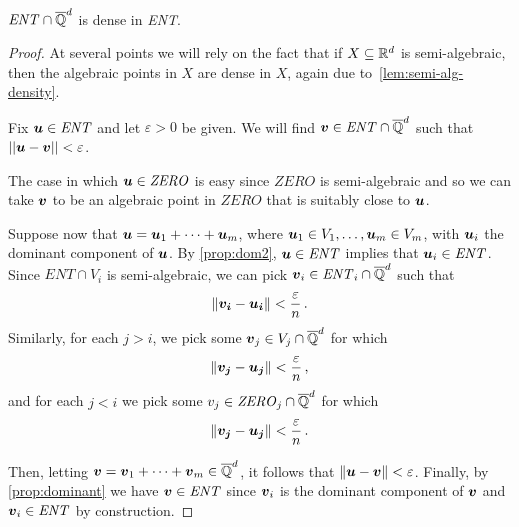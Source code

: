 \begin{corollary}
$\mathit{ENT}\cap\overline{\mathbb{Q}}^{d}$ is dense in \textit{ENT}.
\label{corl:dense}
\end{corollary}

\begin{proof}
  At several points we will rely on the fact that if $X\subseteq\mathbb{R}^{d}$ is semi-algebraic, then the algebraic points in $X$ are dense in $X$, again due to~\cref{lem:semi-alg-density}.

  Fix $\boldsymbol u\in\mathit{ENT}$ and let $\varepsilon>0$ be
  given. We will find $\boldsymbol v\in \mathit{ENT}\cap \overline{\mathbb{Q}}^{d}$
  such that $||\boldsymbol u-\boldsymbol v||<\varepsilon$.

  The case in which $\boldsymbol u \in \mathit{ZERO}$ is easy since
  $\mathit{ZERO}$ is semi-algebraic and so we can take $\boldsymbol v$
  to be an algebraic point in $\mathit{ZERO}$ that is suitably close
  to $\boldsymbol u$.

  Suppose now that $\boldsymbol u=\boldsymbol u_1+\cdots+\boldsymbol
  u_m$, where $\boldsymbol u_1\in V_1,\ldots,\boldsymbol u_m\in V_m$,
  with $\boldsymbol u_i$ the dominant component of $\boldsymbol u$. By
  \cref{prop:dom2}, $\boldsymbol u\in\mathit{ENT}$ implies
  that $\boldsymbol u_i\in \mathit{ENT}$.
  Since $\mathit{ENT}\cap V_i$
  is semi-algebraic, we can pick $\boldsymbol v_i\in \mathit{ENT}_{i}\cap\overline{\mathbb{Q}}^{d}$ such that
  \begin{equation*}
    \| \boldsymbol{v_{i}} -\boldsymbol{u_{i}} \| < \frac{\varepsilon}{n} \, .
  \end{equation*}
  Similarly, for each $j>i$, we pick some $\boldsymbol v_j\in
  V_j\cap \overline{\mathbb{Q}}^{d}$ for which
  \begin{equation*}
    \| \boldsymbol{v_{j}} - \boldsymbol{u_{j}} \| < \frac{\varepsilon}{n} \, ,
  \end{equation*}
  and for each $j<i$ we pick some $v_j \in \mathit{ZERO}_{j} \cap \overline{\mathbb{Q}}^{d}$ for which
  \begin{equation*}
    \| \boldsymbol{v_{j}} - \boldsymbol{u_{j}} \| < \frac{\varepsilon}{n} \, .
  \end{equation*}

  Then, letting $\boldsymbol v=\boldsymbol v_1+\cdots+\boldsymbol v_m
  \in \overline{\mathbb{Q}}^{d}$, it follows that $\|\boldsymbol u-\boldsymbol
  v\|<\varepsilon$.  Finally, by \cref{prop:dominant} we
  have $\boldsymbol v\in\mathit{ENT}$ since $\boldsymbol v_i$ is the
  dominant component of $\boldsymbol v$ and $\boldsymbol v_i \in
  \mathit{ENT}$ by construction.
\end{proof}
